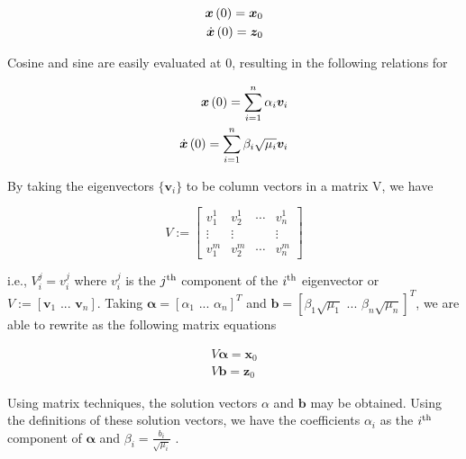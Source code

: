 \documentclass[10pt,a4paper]{article}
\renewcommand{\vec}[1]{\boldsymbol{#1}}
\begin{document}
\begin{multicols*}{2}
\begin{subequations}
	\begin{align}
		\vec{x} \paren{0} = \vec{x}_0 \label{eqn: xic} \\
		\dot{\vec{x}} \paren{0} = \vec{z}_0 \label{eqn: derivative ic}
	\end{align}
\end{subequations}

Cosine and sine are easily evaluated at 0, resulting in the following relations for 

\begin{subequations}
	\begin{align}
		\vec{x}\paren{0} = \sum\limits_{i=1}^n \alpha_i \vec{v}_i \label{eqn: alphaeq} \\
		\dot{\vec{x}}\paren{0} = \sum\limits_{i=1}^n \beta_i \sqrt{\mu_i} \vec{v}_i \label{eqn: betaeq}
	\end{align}
\end{subequations}

By taking the eigenvectors $\{ \vec{v}_i\}$ to be column vectors in a matrix V, we have

$$
V := 
\begin{bmatrix}
	v_1^1 & v_2^1 & \cdots & v_n^1 \\
	\vdots & \vdots & & \vdots \\
	v_1^m & v_2^m & \cdots & v_n^m
\end{bmatrix}
$$

	i.e., $V_i^j = v_i^j$ where $v_i^j$ is the $j^{\rm{th}}$ component of the $i^{\rm{th}}$ eigenvector or $V := [ \vec{v}_1 \,\,...\,\, \vec{v}_n ]$. Taking $\vec{\alpha} = \left[ \alpha_1 \,\,...\,\, \alpha_n \right]^T$ and $\vec{b} = \left[ \beta_1 \sqrt{\mu_1} \,\,...\,\, \beta_n \sqrt{\mu_n} \right]^T$, we are able to rewrite  as the following matrix equations

\begin{subequations}
	\begin{align}
		V \vec{\alpha} = \vec{x}_0 \label{eqn: amat} \\
		V \vec{b} = \vec{z}_0 \label{eqn: bmat}
	\end{align}
\end{subequations}

Using matrix techniques, the solution vectors $\alpha$ and $\vec{b}$ may be obtained. Using the definitions of these solution vectors, we have the coefficients $\alpha_i$ as the $i^{\rm{th}}$ component of $\vec{\alpha}$ and $\beta_i = \frac{b_i}{\sqrt{\mu_i}}$ \cite{vandiver_2011}.



\end{multicols*}
\end{document}
